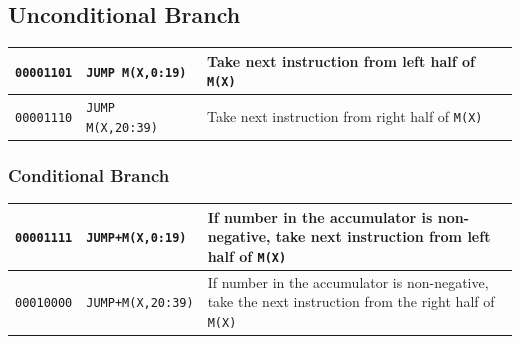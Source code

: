 \subsection*{Unconditional Branch}
\begin{table}[H]
    \centering
    \begin{tabularx}{\textwidth}{XXX}
        \hline
        \texttt{00001101} & \texttt{JUMP M(X,0:19)} & Take next instruction from left half of \texttt{M(X)}\\
        \hline
        \texttt{00001110} & \texttt{JUMP M(X,20:39)} & Take next instruction from right half of \texttt{M(X)}\\
        \hline
    \end{tabularx}
\end{table}

\subsubsection*{Conditional Branch}
\begin{table}[H]
    \centering
    \begin{tabularx}{\textwidth}{XXX}
        \hline
        \texttt{00001111} & \texttt{JUMP+M(X,0:19)} & If number in the accumulator is non-negative, take next instruction from left half of \texttt{M(X)}\\
        \hline
        \texttt{00010000} & \texttt{JUMP+M(X,20:39)} & If number in the accumulator is non-negative, take the next instruction from the right half of \texttt{M(X)}\\
        \hline
    \end{tabularx}
\end{table}

